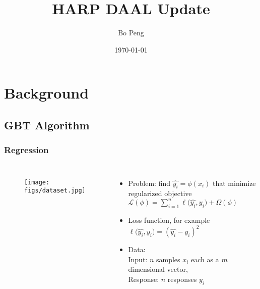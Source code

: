 \documentclass{beamer}
\title[Distributed GBT]{HARP DAAL Update}
\subtitle{}
\author{Bo Peng} %
\institute[IUB] %
{
Digital Science Center \\
Indiana University\\ %
\medskip
\textit{pengb@indiana.edu} %
}
\date{\today} %
\begin{document}
	

\begin{frame}
	\maketitle
\end{frame}

\section{Background} %
\subsection{GBT Algorithm} 
\begin{frame}
	\frametitle{Regression}
	\begin{columns}[c] %
		
		\begin{figure}
			\texttt{[image: figs/dataset.jpg]}
		\end{figure}
		
		\begin{itemize}
			\item Problem: find $\widehat{y_i}=\phi(x_i)$ that minimize regularized objective
			$\mathcal{L(\phi)}= \sum_{i=1}^{n}{\ell{(\widehat{y_i},y_i}) + \Omega(\phi)}$

			\item Loss function, for example $\ell{(\widehat{y_i},y_i})=(\widehat{y_i}-y_i)^2$
			\item Data: \\
			Input: $n$ samples $x_i$ each as a $m$ dimensional vector, \\
			Response: $n$ responses $y_i$
		\end{itemize}
	\end{columns}	
\end{frame}
\end{document}
